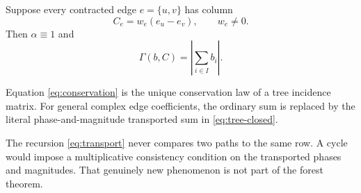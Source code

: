\begin{corollary}\label{cor:incidence}
Suppose every contracted edge \(e=\{u,v\}\) has column
\[
 C_e=w_e(e_u-e_v),
 \qquad w_e\ne0.
\]
Then \(\alpha\equiv1\) and
\begin{equation}\label{eq:conservation}
 \Gamma(b,C)=\left|\sum_{i\in I}b_i\right|.
\end{equation}
\end{corollary}

Equation \eqref{eq:conservation} is the unique conservation law of a
tree incidence matrix.  For general complex edge coefficients, the
ordinary sum is replaced by the literal phase-and-magnitude transported
sum in \eqref{eq:tree-closed}.

\begin{remark}
The recursion \eqref{eq:transport} never compares two paths to the same
row.  A cycle would impose a multiplicative consistency condition on
the transported phases and magnitudes.  That genuinely new phenomenon
is not part of the forest theorem.
\end{remark}

